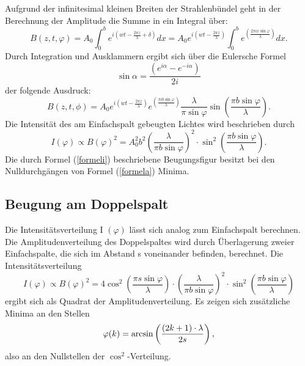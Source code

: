 \documentclass[11pt,ngerman,a4paper]{article}
\begin{document}
Aufgrund der infinitesimal kleinen Breiten der Strahlenbündel geht in der Berechnung der Amplitude die Summe in ein Integral über:
\begin{equation}
B (z, t, \varphi) = A_0 \int_0^b {e^{i\left(wt-\frac{2 \pi z}{\lambda}+ \delta \right) } dx} = A_0 e^{i \left( wt- \frac{2 \pi z}{\lambda} \right)} \int_0^b {e^{\left( \frac{2 \pi i x \sin \varphi}{\lambda} \right) }} dx.
\end{equation}
Durch Integration und Ausklammern ergibt sich über die Eulersche Formel
\begin{equation}
\sin \alpha = \frac{\left( e^{i \alpha} - e^{-i \alpha} \right)}{2i}
\end{equation}
der folgende Ausdruck:
\begin{equation}
B (z,t,\phi) = A_0 e^{i\left( wt- \frac{2 \pi z}{\lambda}\right)} e^{\left( \frac{\pi i b \sin \varphi}{\lambda}\right)} \frac{\lambda}{\pi \sin \varphi} \sin \left( \frac{\pi b \sin \varphi}{\lambda} \right).
\label{formela}
\end{equation}
Die Intensität des am Einfachspalt gebeugten Lichtes wird beschrieben durch
\begin{equation}
I (\varphi) \propto B (\varphi)^2 = A_0^2 b^2 \left ( \frac {\lambda}{\pi b \sin \varphi} \right) ^2 \cdot \sin^2 \left( \frac{\pi b \sin \varphi}{\lambda} \right).
\label{formeli}
\end{equation}
Die durch Formel (\ref{formeli}) beschriebene Beugungsfigur besitzt bei den Nulldurchgängen von Formel (\ref{formela}) Minima.
\subsection{Beugung am Doppelspalt}
Die Intensitätsverteilung I $(\varphi)$ lässt sich analog zum Einfachspalt berechnen. Die Amplitudenverteilung des Doppelspaltes wird durch Überlagerung zweier Einfachspalte, die sich im Abstand s voneinander befinden, berechnet. 
Die Intensitätsverteilung
\begin{equation}
I (\varphi) \propto B(\varphi)^2 = 4 \cos^2 \left( \frac{\pi s \sin \varphi}{\lambda} \right) \cdot \left( \frac{\lambda}{\pi b \sin \varphi} \right)^2 \cdot \sin^2 \left( \frac{\pi b \sin \varphi}{\lambda} \right)
\end{equation}
ergibt sich als Quadrat der Amplitudenverteilung. Es zeigen sich zusätzliche Minima an den Stellen
\begin{equation}
\varphi(k) = \arcsin \left( \frac{(2k+1)\cdot \lambda}{2s} \right) \rm,
\end{equation}
also an den Nullstellen der $\cos^2$-Verteilung.
\end{document}
